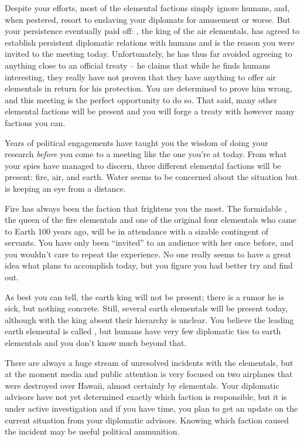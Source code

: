 \documentclass[char]{elementals}
\begin{document}
Despite your efforts, most of the elemental factions simply ignore humans, and, when pestered, resort to enslaving your diplomats for amusement or worse. But your persistence eventually paid off: \cKing{\intro}, the king of the air elementals, has agreed to establish persistent diplomatic relations with humans and is the reason you were invited to the meeting today. Unfortunately, he has thus far avoided agreeing to anything close to an official treaty -- he claims that while he finds humans interesting, they really have not proven that they have anything to offer air elementals in return for his protection. You are determined to prove him wrong, and this meeting is the perfect opportunity to do so. That said, many other elemental factions will be present and you will forge a treaty with however many factions you can.

Years of political engagements have taught you the wisdom of doing your research \emph{before} you come to a meeting like the one you're at today. From what your spies have managed to discern, three different elemental factions will be present: fire, air, and earth. Water seems to be concerned about the situation but is keeping an eye from a distance.


Fire has always been the faction that frightens you the most. The formidable \cQueen{\intro}, the queen of the fire elementals and one of the original four elementals who came to Earth 100 years ago, will be in attendance with a sizable contingent of servants. You have only been ``invited'' to an audience with her once before, and you wouldn't care to repeat the experience. No one really seems to have a great idea what \cQueen{} plans to accomplish today, but you figure you had better try and find out.

As best you can tell, the earth king will not be present; there is a rumor he is sick, but nothing concrete. Still, several earth elementals will be present today, although with the king absent their hierarchy is unclear. You believe the leading earth elemental is called \cLoyal{\intro}, but humans have very few diplomatic ties to earth elementals and you don't know much beyond that.

There are always a huge stream of unresolved incidents with the elementals, but at the moment media and public attention is very focused on two airplanes that were destroyed over Hawaii, almost certainly by elementals. Your diplomatic advisors have not yet determined exactly which faction is responsible, but it is under active investigation and if you have time, you plan to get an update on the current situation from your diplomatic advisors. Knowing which faction caused the incident may be useful political ammunition.
\end{document}
